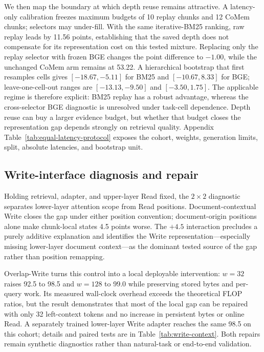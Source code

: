 

We then map the boundary at which depth reuse remains attractive. A latency-only
calibration freezes maximum budgets of 10 replay chunks and 12 CoMem chunks;
selectors may under-fill. With the same iterative-BM25 ranking, raw replay leads
by 11.56 points, establishing that the saved depth does not compensate for its
representation cost on this tested mixture. Replacing only the replay selector
with frozen BGE changes the point difference to $-1.00$, while the unchanged
CoMem arm remains at 53.22. A hierarchical bootstrap that first resamples cells gives
$[-18.67,-5.11]$ for BM25 and $[-10.67,8.33]$ for BGE; leave-one-cell-out
ranges are $[-13.13,-9.50]$ and $[-3.50,1.75]$. The applicable regime is
therefore explicit: BM25 replay has a robust advantage, whereas the
cross-selector BGE diagnostic is unresolved under task-cell dependence. Depth
reuse can buy a larger evidence budget, but whether that budget closes the
representation gap depends strongly on retrieval quality.
Appendix Table~\ref{tab:equal-latency-protocol} exposes the cohort, weights,
generation limits, split, absolute latencies, and bootstrap unit.

\subsection{Write-interface diagnosis and repair}



Holding retrieval, adapter, and upper-layer Read fixed, the $2{\times}2$
diagnostic separates lower-layer attention scope from Read positions.
Document-contextual Write closes the gap under either position convention;
document-origin positions alone make chunk-local states 4.5 points worse. The $+4.5$ interaction precludes a purely additive explanation and identifies
the Write representation---especially missing lower-layer document context---as
the dominant tested source of the gap rather than position remapping.

Overlap-Write turns this control into a local deployable intervention:
$w{=}32$ raises 92.5 to 98.5 and $w{=}128$ to 99.0 while preserving stored
bytes and per-query work. Its measured wall-clock overhead exceeds the theoretical FLOP ratios, but the
result demonstrates that most of the local gap can be repaired with only 32
left-context tokens and no increase in persistent bytes or online Read. A
separately trained lower-layer Write adapter reaches the same 98.5 on this
cohort; details and paired tests are in Table~\ref{tab:write-context}. Both
repairs remain synthetic diagnostics rather than natural-task or end-to-end
validation.

